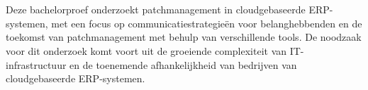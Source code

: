 
%
%
%
%
%

%



\chapter*{}

Deze bachelorproef onderzoekt patchmanagement in cloudgebaseerde ERP-systemen, met een focus op communicatiestrategieën voor belanghebbenden en de toekomst van patchmanagement met behulp van verschillende tools. De noodzaak voor dit onderzoek komt voort uit de groeiende complexiteit van IT-infrastructuur en de toenemende afhankelijkheid van bedrijven van cloudgebaseerde ERP-systemen.

